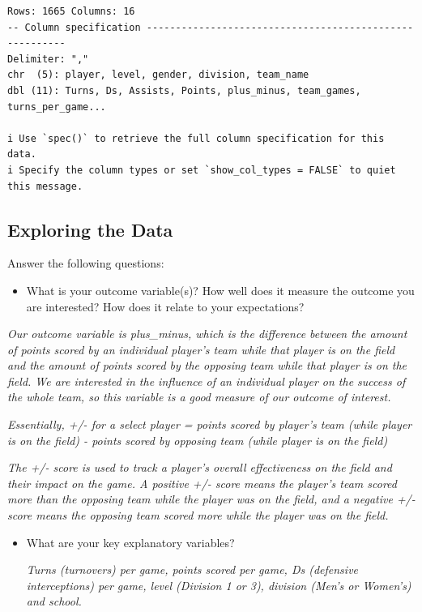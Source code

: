 \documentclass[
  letterpaper,
  DIV=11,
  numbers=noendperiod]{scrartcl}
\providecommand{\tightlist}{%
  \setlength{\itemsep}{0pt}\setlength{\parskip}{0pt}}\usepackage{longtable,booktabs,array}
\begin{document}
\begin{verbatim}
Rows: 1665 Columns: 16
-- Column specification --------------------------------------------------------
Delimiter: ","
chr  (5): player, level, gender, division, team_name
dbl (11): Turns, Ds, Assists, Points, plus_minus, team_games, turns_per_game...

i Use `spec()` to retrieve the full column specification for this data.
i Specify the column types or set `show_col_types = FALSE` to quiet this message.
\end{verbatim}

\subsection{Exploring the Data}\label{exploring-the-data}

Answer the following questions:

\begin{itemize}
\tightlist
\item
  What is your outcome variable(s)? How well does it measure the outcome
  you are interested? How does it relate to your expectations?
\end{itemize}

\emph{Our outcome variable is plus\_minus, which is the difference
between the amount of points scored by an individual player's team while
that player is on the field and the amount of points scored by the
opposing team while that player is on the field. We are interested in
the influence of an individual player on the success of the whole team,
so this variable is a good measure of our outcome of interest.}

\emph{Essentially, +/- for a select player = points scored by player's
team (while player is on the field) - points scored by opposing team
(while player is on the field)}

\emph{The +/- score is used to track a player's overall effectiveness on
the field and their impact on the game. A positive +/- score means the
player's team scored more than the opposing team while the player was on
the field, and a negative +/- score means the opposing team scored more
while the player was on the field.}

\begin{itemize}
\item
  What are your key explanatory variables?

  \emph{Turns (turnovers) per game, points scored per game, Ds
  (defensive interceptions) per game, level (Division 1 or 3), division
  (Men's or Women's) and school.}
\end{itemize}
\end{document}
